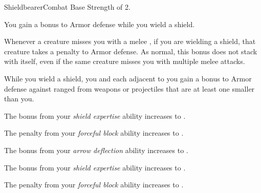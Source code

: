     \begin{feat}{Shieldbearer}{Combat}
        \featpre Base Strength of 2.

         You gain a  bonus to Armor defense while you wield a shield.

         Whenever a creature misses you with a melee , if you are wielding a shield, that creature  takes a  penalty to Armor defense.
        As normal, this bonus does not stack with itself, even if the same creature misses you with multiple melee attacks.

         While you wield a shield, you and each  adjacent to you gain a  bonus to Armor defense against ranged  from weapons or projectiles that are at least one  smaller than you.

         The bonus from your \textit{shield expertise} ability increases to .

         The penalty from your \textit{forceful block} ability increases to .

         The bonus from your \textit{arrow deflection} ability increases to .

         The bonus from your \textit{shield expertise} ability increases to .

         The penalty from your \textit{forceful block} ability increases to .
    \end{feat}

